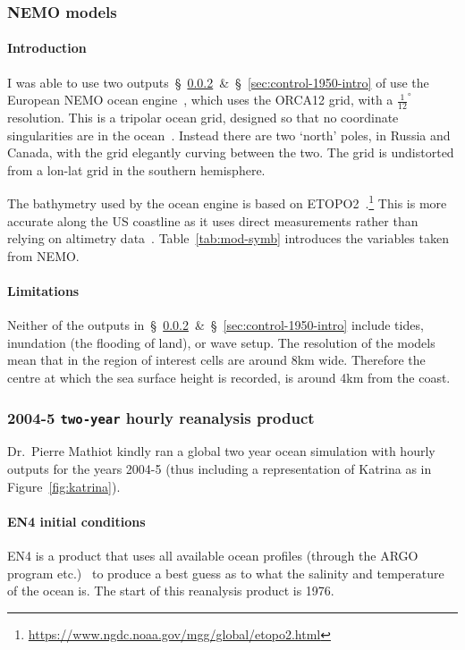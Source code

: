 \subsubsection{NEMO models}
\paragraph{Introduction}
\label{sec:nemo}
I was able to use two outputs~§~\ref{sec:rean-prod}~\&~§~\ref{sec:control-1950-intro}
of use the European NEMO ocean engine~\cite{madec2015nemo}, which uses the ORCA12 grid, with a  $\frac{1}{12}^{\circ}$
resolution.
This is a tripolar ocean grid, designed so that no coordinate singularities are in the ocean~\cite{madec1996global}.
Instead there are two `north' poles, in Russia and Canada,
with the grid elegantly curving between the two.
The grid is undistorted from a lon-lat
 grid in the southern hemisphere.

 The bathymetry used by the ocean engine is based on
 ETOPO2~\cite{lecointre2011definition, noaa20062}.\footnote{\url{https://www.ngdc.noaa.gov/mgg/global/etopo2.html}}
 This is more accurate along the US coastline as it uses
 direct measurements rather than relying on altimetry data~\cite{noaa20062}.
 Table~\ref{tab:mod-symb} introduces the variables taken from NEMO.



\paragraph{Limitations}

Neither of the outputs in~§~\ref{sec:rean-prod}~\&~§~\ref{sec:control-1950-intro}
include tides, inundation (the flooding of land), or wave setup.
The resolution of the models mean that in the region of interest cells are around
8km wide. Therefore the centre at which the sea surface height is recorded,
is around 4km from the coast.

\subsubsection{2004-5 \texttt{two-year} hourly reanalysis product}
\label{sec:rean-prod}
Dr.~Pierre Mathiot kindly ran a global two year ocean simulation with
hourly outputs for the years 2004-5 (thus including a representation of Katrina as
in Figure~\ref{fig:katrina}).

\paragraph{EN4 initial conditions}
EN4 is a product that uses all available ocean profiles
(through the ARGO program etc.)~\cite{good2013en4, HadObs}
to produce a best guess as to what the salinity and temperature of the ocean is.
 The start of this reanalysis product is 1976.


